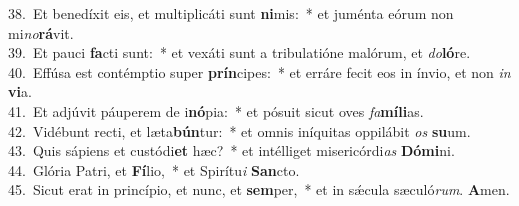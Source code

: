 {38.~}Et benedíxit eis, et multiplicáti sunt \textbf{ni}mis:~* et juménta eórum non mi\textit{no}\textbf{rá}vit.\\
{39.~}Et pauci \textbf{fa}cti sunt:~* et vexáti sunt a tribulatióne malórum, et \textit{do}\textbf{ló}re.\\
{40.~}Effúsa est contémptio super \textbf{prín}cipes:~* et erráre fecit eos in ínvio, et non \textit{in} \textbf{vi}a.\\
{41.~}Et adjúvit páuperem de i\textbf{nó}pia:~* et pósuit sicut oves \textit{fa}\textbf{mí}\textbf{li}as.\\
{42.~}Vidébunt recti, et læta\textbf{bún}tur:~* et omnis iníquitas oppilábit \textit{os} \textbf{su}um.\\
{43.~}Quis sápiens et custódi\textbf{et} hæc?~* et intélliget misericórdi\textit{as} \textbf{Dó}\textbf{mi}ni.\\
{44.~}Glória Patri, et \textbf{Fí}lio,~* et Spirítu\textit{i} \textbf{San}cto.\\
{45.~}Sicut erat in princípio, et nunc, et \textbf{sem}per,~* et in sǽcula sæculó\textit{rum}. \textbf{A}men.\\
